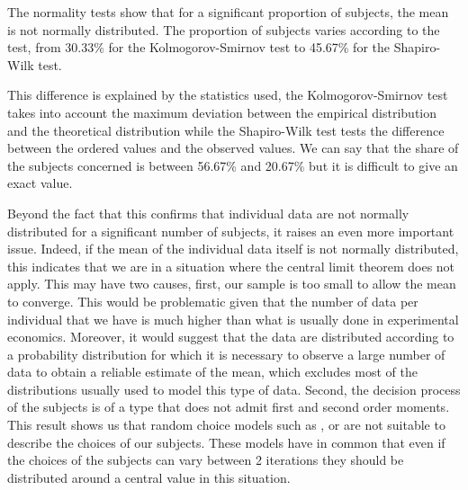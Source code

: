 \documentclass[
]{book}
\begin{document}
The normality tests show that for a significant proportion of subjects,
the mean is not normally distributed. The proportion of subjects varies
according to the test, from 30.33\%
for the Kolmogorov-Smirnov test to
45.67\% for the Shapiro-Wilk test.

This difference is explained by the statistics used, the
Kolmogorov-Smirnov test takes into account the maximum deviation between
the empirical distribution and the theoretical distribution while the
Shapiro-Wilk test tests the difference between the ordered values and
the observed values. We can say that the share of the subjects concerned
is between 56.67\% and
20.67\% but it is difficult to
give an exact value.

Beyond the fact that this confirms that individual data are not normally
distributed for a significant number of subjects, it raises an even more
important issue. Indeed, if the mean of the individual data itself is
not normally distributed, this indicates that we are in a situation
where the central limit theorem does not apply. This may have two
causes, first, our sample is too small to allow the mean to converge.
This would be problematic given that the number of data per individual
that we have is much higher than what is usually done in experimental
economics. Moreover, it would suggest that the data are distributed
according to a probability distribution for which it is necessary to
observe a large number of data to obtain a reliable estimate of the
mean, which excludes most of the distributions usually used to model
this type of data. Second, the decision process of the subjects is of a
type that does not admit first and second order moments.
This result shows us that random choice models such as \citet{gul2006random},
\citet{gul2014random} or \citet{cerreia2019deliberately} are not suitable to describe the
choices of our subjects.
These models have in common that even if the choices of the subjects can vary
between 2 iterations they should be distributed around a central value in this
situation.
\end{document}
